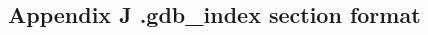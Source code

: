 \documentclass[class=book, crop=false]{standalone}
\begin{document}
\begin{CJK}{UTF8}{gbsn}

\chapter*{Appendix J .gdb\_index section format}



\cleardoublepage

\end{CJK}
\end{document}
